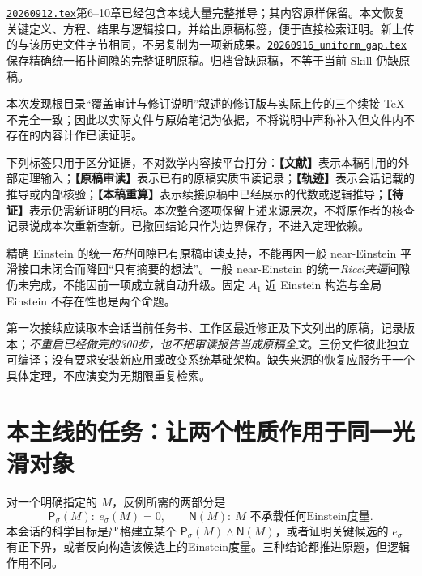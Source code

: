 \documentclass[UTF8,a4paper,11pt,fontset=fandol]{ctexart}
\numberwithin{equation}{section}
\theoremstyle{definition}
\newcommand{\status}[1]{\textbf{【#1】}}
\begin{document}
\href{20260912.tex}{\texttt{20260912.tex}}第6--10章已经包含本线大量完整推导；其内容原样保留。本文恢复关键定义、方程、结果与逻辑接口，并给出原稿标签，便于直接检索证明。新上传的与该历史文件字节相同，不另复制为一项新成果。\href{20260916_uniform_gap.tex}{\texttt{20260916\_uniform\_gap.tex}}保存精确统一拓扑间隙的完整证明原稿。归档曾缺原稿，不等于当前 Skill 仍缺原稿。

本次发现根目录“覆盖审计与修订说明”叙述的修订版与实际上传的三个续接 TeX 不完全一致；因此以实际文件与原始笔记为依据，不将说明中声称补入但文件内不存在的内容计作已读证明。

下列标签只用于区分证据，不对数学内容按平台打分：\status{文献}表示本稿引用的外部定理输入；\status{原稿审读}表示已有的原稿实质审读记录；\status{轨迹}表示会话记载的推导或内部核验；\status{本稿重算}表示续接原稿中已经展示的代数或逻辑推导；\status{待证}表示仍需新证明的目标。本次整合逐项保留上述来源层次，不将原作者的核查记录说成本次重新查新。已撤回结论只作为边界保存，不进入定理依赖。

精确 Einstein 的统一\emph{拓扑}间隙已有原稿审读支持，不能再因一般 near-Einstein 平滑接口未闭合而降回“只有摘要的想法”。一般 near-Einstein 的统一\emph{Ricci夹逼}间隙仍未完成，不能因前一项成立就自动升级。固定 $A_1$ 近 Einstein 构造与全局 Einstein 不存在性也是两个命题。

第一次接续应读取本会话当前任务书、工作区最近修正及下文列出的原稿，记录版本；\emph{不重启已经做完的300步，也不把审读报告当成原稿全文}。三份文件彼此独立可编译；没有要求安装新应用或改变系统基础架构。缺失来源的恢复应服务于一个具体定理，不应演变为无期限重复检索。

\section{本主线的任务：让两个性质作用于同一光滑对象}
对一个明确指定的 $M$，反例所需的两部分是
\[
\mathsf P_\sigma(M):\ e_\sigma(M)=0,
\qquad
\mathsf N(M):\ M\text{ 不承载任何Einstein度量}.
\]
本会话的科学目标是严格建立某个 $\mathsf P_\sigma(M)\land\mathsf N(M)$，或者证明关键候选的 $e_\sigma$ 有正下界，或者反向构造该候选上的Einstein度量。三种结论都推进原题，但逻辑作用不同。
\end{document}
